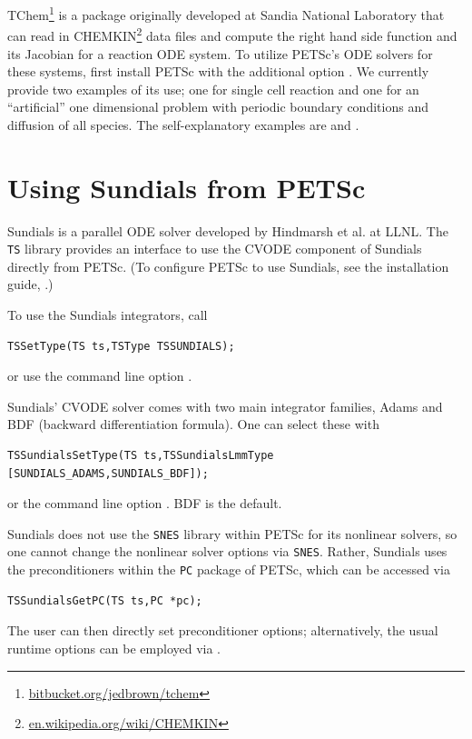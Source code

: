 TChem\footnote{\href{https://bitbucket.org/jedbrown/tchem}{bitbucket.org/jedbrown/tchem}} 
is a package originally developed at Sandia National Laboratory that can read in 
CHEMKIN\footnote{\href{https://en.wikipedia.org/wiki/CHEMKIN}{en.wikipedia.org/wiki/CHEMKIN}} 
data files and compute the right hand side function and its Jacobian for a reaction ODE system.
To utilize PETSc's ODE solvers for these systems, first install PETSc with the additional 
 option . We currently provide two examples of its use;
one for single cell reaction and one for an ``artificial'' one dimensional problem with 
periodic boundary conditions and diffusion of all species. The self-explanatory examples 
are \href{http://www.mcs.anl.gov/petsc/petsc-current/src/ts/examples/tutorials/extchem.c.html}{} 
and \href{http://www.mcs.anl.gov/petsc/petsc-current/src/ts/examples/tutorials/exchemfield.c.html}{}.

\section{Using Sundials from PETSc}
\label{sec_sundials}

Sundials is a parallel ODE solver developed by Hindmarsh et al. at
LLNL.  The \lstinline{TS} library provides an interface to use the
CVODE component of Sundials directly from PETSc.  (To configure PETSc
to use Sundials, see the installation
guide, .)

To use the Sundials integrators, call
\begin{lstlisting}
TSSetType(TS ts,TSType TSSUNDIALS);
\end{lstlisting}
or use the command line option  .
  

Sundials' CVODE solver comes with two main integrator families, Adams
and BDF (backward differentiation formula). One can select these with
\begin{lstlisting}
TSSundialsSetType(TS ts,TSSundialsLmmType [SUNDIALS_ADAMS,SUNDIALS_BDF]);
\end{lstlisting}
or the command line option . BDF is
the default. 
 

Sundials does not use the \lstinline{SNES} library within PETSc for its nonlinear
solvers, so one cannot change the nonlinear solver options via
\lstinline{SNES}. Rather, Sundials uses the preconditioners within the \lstinline{PC} package
of PETSc, which can be accessed via
\begin{lstlisting}
TSSundialsGetPC(TS ts,PC *pc);
\end{lstlisting}
The user can then directly set preconditioner options;
alternatively, the usual runtime options can be employed
via .

